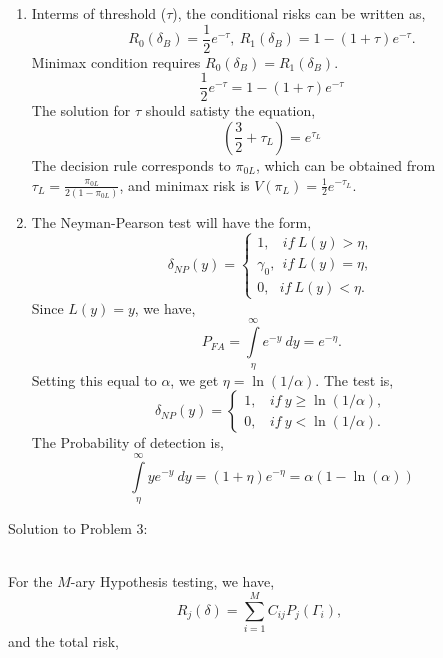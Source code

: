 \documentclass[a4paper,english,10pt]{article}
\begin{document}
\begin{enumerate}[label=(\alph*).]
\item Interms of threshold ($\tau$), the conditional risks can be written as,
 \begin{equation*}
 R_0(\delta_B)=\frac{1}{2}e^{-\tau},~R_1(\delta_B)=1-(1+\tau)e^{-\tau}.
 \end{equation*}
 Minimax condition requires $R_0(\delta_B)=R_1(\delta_B)$.
 \begin{equation*}
	\frac{1}{2}e^{-\tau}=1-(1+\tau)e^{-\tau}
 \end{equation*}
 The solution for $\tau$ should satisty the equation,
 \begin{equation*}
	\left(\frac{3}{2}+\tau_L\right)=e^{\tau_L}
 \end{equation*}
 The decision rule corresponds to $\pi_{0L}$, which can be obtained from $\tau_L=\frac{\pi_{0L}}{2(1-\pi_{0L})}$, and minimax risk is $V(\pi_L)=\frac{1}{2}e^{-\tau_L}$.
 \item The Neyman-Pearson test will have the form,
 \begin{equation*}
	\delta_{NP}(y)=\begin{cases}
		1,~~~~if~L(y)> \eta,\\
		\gamma_0,~~if~L(y)=\eta,\\
		0,~~~if~L(y)<\eta.
	\end{cases}
 \end{equation*}
 Since $L(y)=y$, we have,
 \begin{equation*}
P_{FA}=\int\limits_{\eta}^{\infty} e^{-y}~dy=e^{-\eta}.
 \end{equation*}
Setting this equal to $\alpha$, we get $\eta=\ln(1/\alpha)$. The test is,
 \begin{equation*}
	\delta_{NP}(y)=\begin{cases}
		1,~~~~if~y\geq \ln(1/\alpha),\\
		0,~~~~if~y<\ln(1/\alpha).
	\end{cases}
 \end{equation*}
 The Probability of detection is,
 \begin{equation*}
	\int\limits_{\eta}^{\infty}ye^{-y}~dy=(1+\eta) e^{-\eta}=\alpha(1-\ln(\alpha))
 \end{equation*}
\end{enumerate}
\hypertarget{solution3}{Solution to Problem 3:}\\
For the $M$-ary Hypothesis testing, we have,
\begin{equation*}
R_j(\delta)=\sum\limits_{i=1}^{M} C_{ij} P_j(\Gamma_i),
\end{equation*}
and the total risk,
\end{document}
